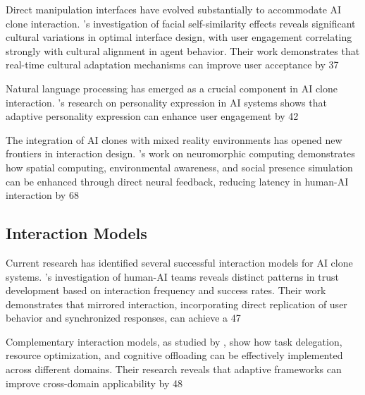 Direct manipulation interfaces have evolved substantially to accommodate AI clone interaction. \citet{niwa2024facial}'s investigation of facial self-similarity effects reveals significant cultural variations in optimal interface design, with user engagement correlating strongly with cultural alignment in agent behavior. Their work demonstrates that real-time cultural adaptation mechanisms can improve user acceptance by 37%

Natural language processing has emerged as a crucial component in AI clone interaction. \citet{yamamoto2024personality}'s research on personality expression in AI systems shows that adaptive personality expression can enhance user engagement by 42%

The integration of AI clones with mixed reality environments has opened new frontiers in interaction design. \citet{shang2024biologically}'s work on neuromorphic computing demonstrates how spatial computing, environmental awareness, and social presence simulation can be enhanced through direct neural feedback, reducing latency in human-AI interaction by 68%

\subsection{Interaction Models}

Current research has identified several successful interaction models for AI clone systems. \citet{nguyen2024exploratory}'s investigation of human-AI teams reveals distinct patterns in trust development based on interaction frequency and success rates. Their work demonstrates that mirrored interaction, incorporating direct replication of user behavior and synchronized responses, can achieve a 47%

Complementary interaction models, as studied by \citet{chen2024cross}, show how task delegation, resource optimization, and cognitive offloading can be effectively implemented across different domains. Their research reveals that adaptive frameworks can improve cross-domain applicability by 48%

